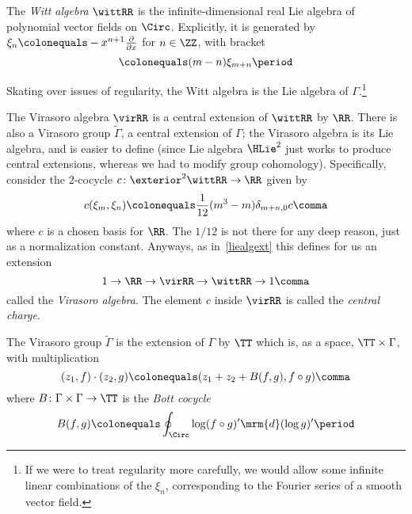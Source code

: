\begin{defn}  
\label{Witt_algebra}
	The \emph{Witt algebra} $\wittRR$ is the infinite-dimensional real Lie algebra of polynomial vector fields on $\Circ$.
	Explicitly, it is generated by $\xi_n\colonequals -x^{n+1}\frac{\partial}{\partial x}$ for $n\in\ZZ$, with bracket
	\begin{equation}
		[\xi_m, \xi_n] \colonequals (m-n)\xi_{m+n} \period
	\end{equation}
\end{defn}

\noindent Skating over issues of regularity, the Witt algebra is the Lie algebra of $\Gamma$.\footnote{If we were to treat
regularity more carefully, we would allow some infinite linear combinations of the $\xi_n$, corresponding to the
Fourier series of a smooth vector field.}

The Virasoro algebra $\virRR$ is a central extension of $\wittRR$ by $\RR$.   
There is also a Virasoro group
$\widetilde\Gamma$, a central extension of $\Gamma$; the Virasoro algebra is its Lie algebra, and is easier to
define (since Lie algebra $\HLie^2$ just works to produce central extensions, whereas we had to modify group
cohomology). Specifically, consider the $2$-cocycle $c\colon \exterior^2\wittRR\to\RR$ given by
\begin{equation}
	c(\xi_m, \xi_n) \colonequals \frac{1}{12}(m^3-m)\delta_{m+n, 0}c \comma
\end{equation}
where $c$ is a chosen basis for $\RR$. The $1/12$ is not there for any deep reason, just as a normalization
constant. Anyways, as in~\eqref{liealgext} this defines for us an extension
\begin{equation*}
	1\to\RR\to\virRR\to\wittRR\to 1 \comma
\end{equation*}
called the \emph{Virasoro algebra}. The element $c$ inside $\virRR$ is called the \emph{central charge}.  

The Virasoro group $\widetilde\Gamma$ is the extension of $\Gamma$ by $\TT$ which is, as a space,
$\TT\times\Gamma$, with multiplication
\begin{equation}
	(z_1, f)\cdot (z_2, g) \colonequals (z_1 + z_2 + B(f, g), f\circ g) \comma
\end{equation}
where $B\colon \Gamma\times\Gamma\to\TT$ is the \emph{Bott cocycle}  
\begin{equation}
	B(f, g)\colonequals \oint_{\Circ} \log(f\circ g)' \mrm{d}(\log g)' \period
\end{equation}


